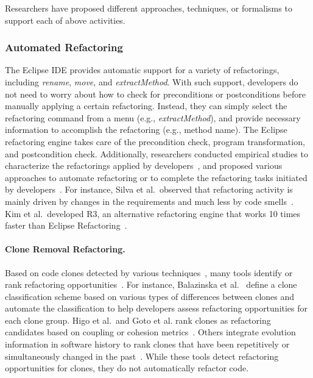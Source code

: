 \documentclass[runningheads,a4paper]{llncs}
\begin{document}
Researchers have proposed different approaches, techniques, or formalisms to support each of above activities.

\subsubsection{Automated Refactoring} 

The Eclipse IDE provides automatic support for a variety of refactorings, including \emph{rename}, \emph{move}, and \emph{extractMethod}. With such support, developers do not need to worry about how to check for preconditions or postconditions before manually applying a certain refactoring. Instead, they can simply select the refactoring command from a menu (e.g., \emph{extractMethod}), and provide necessary information to accomplish the refactoring (e.g., method name). The Eclipse refactoring engine takes care of the precondition check, program transformation, and postcondition check. Additionally, 
researchers conducted empirical studies to characterize the refactorings applied by developers~\cite{Kim2012:FSR,Murphy-Hill2012:refactor,Vailian2012:misuse,Silva2016:WWR}, and proposed various approaches to automate refactoring or to complete the refactoring tasks initiated by developers~\cite{Griswold:1992,Balazinska1999,Dig:2009,Ge:2012,Chen:2013,Lee:2013,Tsantalis2013:icsm,Meng:2015,Kim:2016}. For instance, Silva et al.~observed that refactoring activity is mainly driven by changes in the requirements and much less by code smells~\cite{Silva2016:WWR}. Kim et al.~developed R3, an alternative refactoring engine that works 10 times faster than Eclipse Refactoring~\cite{Kim:2016}. 


\paragraph{Clone Removal Refactoring.}  
Based on code clones detected by various techniques~\cite{Kamiya2002, Jiang2007:deckard, Krinke2001}, many tools identify or rank refactoring opportunities~\cite{Balazinska1999a, Higo2008, Goto2013:rank, Higo2013, Tsantalis2011:ranking}. For instance, Balazinska et al.~\cite{Balazinska1999a} define a clone classification scheme based on various types of differences between clones and automate the classification to help developers assess refactoring opportunities for each clone group. Higo et al.~and Goto et al.\/ rank clones as refactoring candidates based on coupling or cohesion metrics~\cite{Higo2008,Goto2013:rank}. Others integrate evolution information in software history to rank clones that have been repetitively or simultaneously changed in the past~\cite{Higo2013, Tsantalis2011:ranking}. While these tools detect refactoring opportunities for clones, they do not automatically refactor code.
\end{document}
